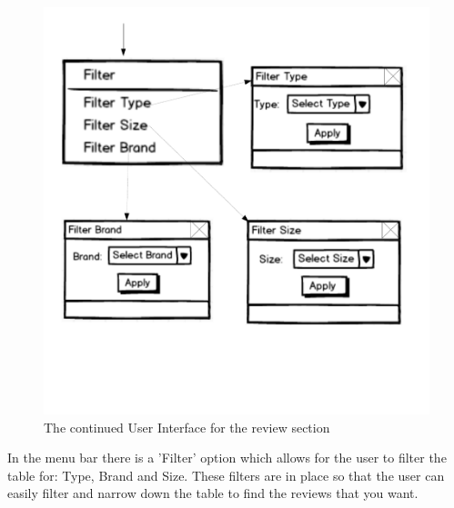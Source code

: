 \begin{figure}[H]
    \includegraphics[width=\textwidth]{./Design/ReviewsUI2.pdf}
    \caption{The continued User Interface for the review section} \label{fig: Review User Interface Continued}
\end{figure}

In the menu bar there is a 'Filter' option which allows for the user to filter the table for: Type, Brand and Size. These filters are in place so that the user can easily filter and narrow down the table to find the reviews that you want.

